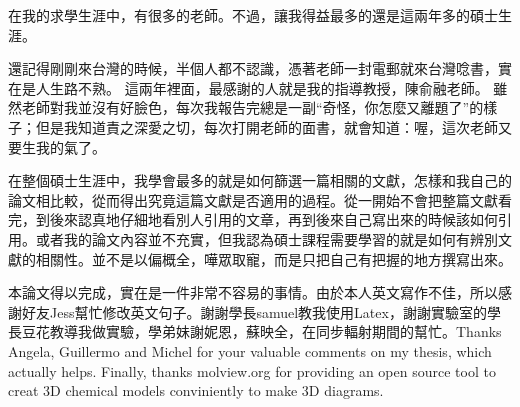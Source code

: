 \begin{acknowledgements} 

在我的求學生涯中，有很多的老師。不過，讓我得益最多的還是這兩年多的碩士生涯。

還記得剛剛來台灣的時候，半個人都不認識，憑著老師一封電郵就來台灣唸書，實在是人生路不熟。 這兩年裡面，最感謝的人就是我的指導教授，陳俞融老師。 雖然老師對我並沒有好臉色，每次我報告完總是一副“奇怪，你怎麼又離題了”的樣子；但是我知道責之深愛之切，每次打開老師的面書，就會知道：喔，這次老師又要生我的氣了。

在整個碩士生涯中，我學會最多的就是如何篩選一篇相關的文獻，怎樣和我自己的論文相比較，從而得出究竟這篇文獻是否適用的過程。從一開始不會把整篇文獻看完，到後來認真地仔細地看別人引用的文章，再到後來自己寫出來的時候該如何引用。或者我的論文內容並不充實，但我認為碩士課程需要學習的就是如何有辨別文獻的相關性。並不是以偏概全，嘩眾取寵，而是只把自己有把握的地方撰寫出來。

本論文得以完成，實在是一件非常不容易的事情。由於本人英文寫作不佳，所以感謝好友Jess幫忙修改英文句子。謝謝學長samuel教我使用Latex，謝謝實驗室的學長豆花教導我做實驗，學弟妹謝妮恩，蘇映全，在同步輻射期間的幫忙。Thanks Angela, Guillermo and Michel for your valuable comments on my thesis, which actually helps. Finally, thanks molview.org for providing an open source tool to creat 3D chemical models conviniently to make 3D diagrams.

\end{acknowledgements} 
